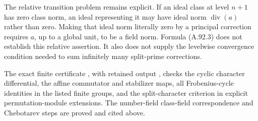 The relative transition problem remains explicit.  If an ideal
class at level $n+1$ has zero class norm, an ideal representing
it may have ideal norm $\operatorname{div}(a)$ rather than zero.
Making that ideal norm literally zero by a principal correction
requires $a$, up to a global unit, to be a field norm.
Formula (A.92.3) does not establish this relative assertion.
It also does not supply the levelwise convergence condition
needed to sum infinitely many split-prime corrections.

\noindent The exact finite certificate
, with retained output
, checks the
cyclic character differential, the affine commutator and stabilizer
maps, all Frobenius-cycle identities in the listed finite groups,
and the split-character criterion in explicit permutation-module
extensions.  The number-field class-field correspondence and
Chebotarev steps are proved and cited above.

